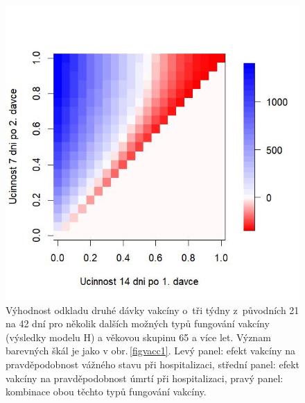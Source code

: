 \begin{figure}[p]
\begin{center}
\begin{minipage}[m]{0.3\linewidth}
		\end{minipage}
		\begin{minipage}[m]{0.3\linewidth}
			\includegraphics[width=\textwidth]{pic/JDL_DIFF_mean_T.jpg}
		\end{minipage}
	\end{center}
	\caption{Výhodnost odkladu druhé dávky vakcíny o~tři týdny z~původních 21 na 42 dní pro několik dalších možných typů fungování vakcíny (výsledky modelu H) a věkovou skupinu 65 a více let. Význam barevných škál je jako v obr.\,\ref{figvacc1}. Levý panel: efekt vakcíny na pravděpodobnost vážného stavu při hospitalizaci, střední panel: efekt vakcíny na pravděpodobnost úmrtí při hospitalizaci, pravý panel: kombinace obou těchto typů fungování vakcíny.}
	\label{figvacc2}
\end{figure}

